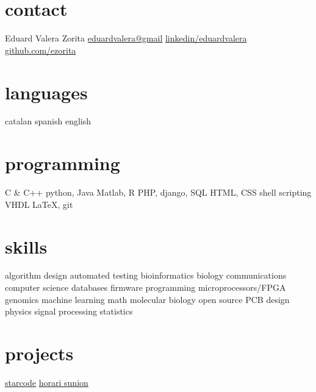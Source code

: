 \documentclass[]{friggeri-cv} %
\begin{document}



\begin{aside} %
  \section{contact}
  {\FA \faUser}
  Eduard Valera Zorita
  {\FA \faEnvelope}
  \href{mailto:eduardvalera@gmail.com}{eduardvalera@gmail}
  {\FA \faLinkedinSign}
  \href{http://www.linkedin.com/in/eduardvalera}{linkedin/eduardvalera}
  {\FA \faGithubSign}
  \href{http://github.com/ezorita}{github.com/ezorita}
  \section{languages}
  catalan
  spanish
  english
  \section{programming}
  C \& C++
  python, Java
  Matlab, R
  PHP, django, SQL
  HTML, CSS
  shell scripting
  VHDL
  \LaTeX, git
  \section{skills}
  algorithm design
  automated testing
  bioinformatics
  biology
  communications
  computer science
  databases
  firmware programming
  microprocessors/FPGA
  genomics
  machine learning
  math
  molecular biology
  open source
  PCB design
  physics
  signal processing
  statistics
  \section{projects}
  \href{http://github.com/gui11aume/starcode}{starcode}
  \href{http://horari.sunion.cat}{horari sunion}
\end{aside}

\end{document}
